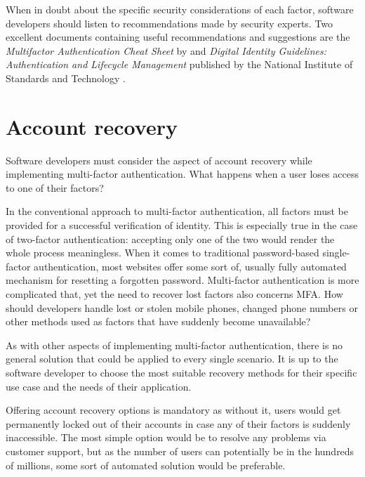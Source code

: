 When in doubt about the specific security considerations of each factor, software developers should listen to recommendations made by security experts. Two excellent documents containing useful recommendations and suggestions are the \textit{Multifactor Authentication Cheat Sheet} by \textcite{owasp_multifactor_2024} and \textit{Digital Identity Guidelines: Authentication and Lifecycle Management} published by the National Institute of Standards and Technology \citep{grassi_digital_2017}.


\newpage

\section{Account recovery}

Software developers must consider the aspect of account recovery while implementing multi-factor authentication. What happens when a user loses access to one of their factors?

In the conventional approach to multi-factor authentication, all factors must be provided for a successful verification of identity. This is especially true in the case of two-factor authentication: accepting only one of the two would render the whole process meaningless. When it comes to traditional password-based single-factor authentication, most websites offer some sort of, usually fully automated mechanism for resetting a forgotten password. Multi-factor authentication is more complicated that, yet the need to recover lost factors also concerns MFA. How should developers handle lost or stolen mobile phones, changed phone numbers or other methods used as factors that have suddenly become unavailable?

As with other aspects of implementing multi-factor authentication, there is no general solution that could be applied to every single scenario. It is up to the software developer to choose the most suitable recovery methods for their specific use case and the needs of their application.

Offering account recovery options is mandatory as without it, users would get permanently locked out of their accounts in case any of their factors is suddenly inaccessible. The most simple option would be to resolve any problems via customer support, but as the number of users can potentially be in the hundreds of millions, some sort of automated solution would be preferable.

